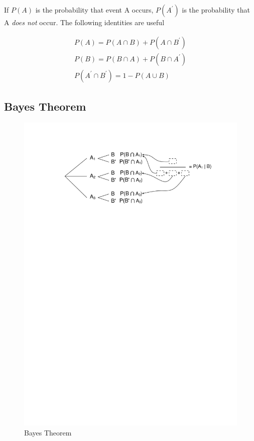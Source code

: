 \documentclass[a5paper]{article}
\begin{document}
If $P(A)$ is the probability that event A occurs, $P(A^\prime)$ is the
probability that A \textit{does not} occur. The following identities are useful

\begin{eqnarray}
  P(A) = P(A\cap B) + P(A\cap B^\prime) \\
  P(B) = P(B\cap A) + P(B\cap A^\prime) \\
  P(A^\prime \cap B^\prime) = 1 - P(A \cup B)
\end{eqnarray}

\subsection{Bayes Theorem}

\begin{figure}[t]
  \includegraphics{bayes-theorem}

  \caption{Bayes Theorem}
  \label{fig:3}
\end{figure}
\end{document}

